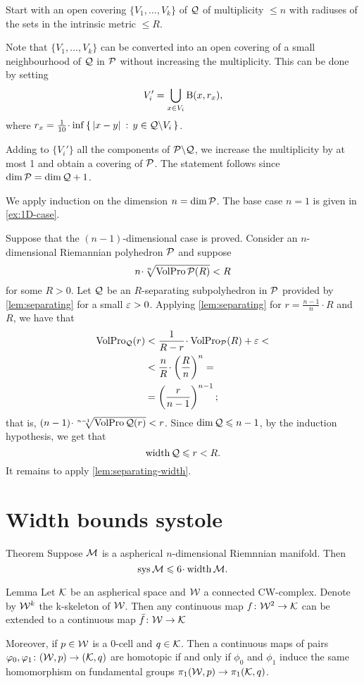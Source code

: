 Start with an open covering $\{V_1,\dots,V_k\}$ of $\mathcal{Q}$ of multiplicity $\le n$ with radiuses of the sets in the intrinsic metric $\le R$.

Note that $\{V_1,\dots,V_k\}$ can be converted into an open covering of
a small neighbourhood of $\mathcal{Q}$ in $\mathcal{P}$ without increasing the multiplicity.
This can be done by setting 
\[V_i'=\bigcup_{x\in V_i}\mathrm{B}{}(x,r_x),\]
where $r_x=\tfrac1{10}\cdot\inf\set{\dist{x}{y}{}}{y\in \spc{Q}\backslash V_i}$.

Adding to  $\{V_i'\}$ all the components of $\mathcal{P}\backslash \mathcal{Q}$,
we increase the multiplicity by at most 1 and obtain a covering of $\mathcal{P}$.
The statement follows since $\dim \spc{P}= \dim \spc{Q}\z+1$.
\qeds

We apply induction on the dimension $n=\operatorname{\rm dim}\nolimits\mathcal{P}$.
The base case $n=1$ is given in \ref{ex:1D-case}.

Suppose that the  $(n-1)$-dimensional case is proved.
Consider an $n$-dimensional Riemannian polyhedron $\mathcal{P}$ and suppose
\[n\cdot \sqrt[n]{\VolPro\spc{P}(R)}< R\]
for some $R>0$.
Let $\mathcal{Q}$ be an $R$-separating subpolyhedron in $\mathcal{P}$ provided by \ref{lem:separating} for a small $\varepsilon>0$.
Applying  \ref{lem:separating} for $r=\tfrac{n-1}n\cdot R$ and $R$, we have that 
\begin{align*}
\VolPro_\spc{Q}(r) &< \frac 1{R-r}\cdot \VolPro_\spc{P}(R)+\eps<
\\
&<\frac {n}{R}\cdot\left(\frac{R}{n}\right)^n=
\\
&=\left(\frac{r}{n-1}\right)^{n-1};
\end{align*}
that is, $(n-1)\cdot \sqrt[n-1]{\VolPro\spc{Q}(r)}< r$.
Since $\operatorname{\rm dim}\nolimits\mathcal{Q}\leqslant n-1$, by the induction hypothesis, we get that
\[\operatorname{\rm width}\nolimits\mathcal{Q}\leqslant r<R.\]
It remains to apply \ref{lem:separating-width}.
\qeds





\section{Width bounds systole}

\begin{thm}{Theorem}\label{thm:sys<width}
Suppose $\mathcal{M}$ is a aspherical $n$-dimensional Riemnnian manifold.
Then 
\[\sys\spc{M}\le 6 \cdot \width \spc{M}.\]
\end{thm}

\begin{thm}{Lemma}\label{lem:aspherical-homotopy}
Let $\mathcal{K}$ be an aspherical space and $\mathcal{W}$ a connected CW-complex.
Denote by $\mathcal{W}^k$ the k-skeleton of $\mathcal{W}$.
Then any continuous map $f\colon\mathcal{W}^2\to \mathcal{K}$ can be extended to a continuous map $\bar f\colon\mathcal{W}\to \mathcal{K}$

Moreover, if $p\in \mathcal{W}$ is a 0-cell and $q\in \mathcal{K}$.
Then a continuous maps of pairs $\varphi_0,\varphi_1\colon(\mathcal{W},p)\to(\mathcal{K},q)$ are homotopic if and only if $\phi_0$ and $\phi_1$ induce the same homomorphism on fundamental groups $\pi_1(\mathcal{W},p)\to\pi_1(\mathcal{K},q)$.
\end{thm}

